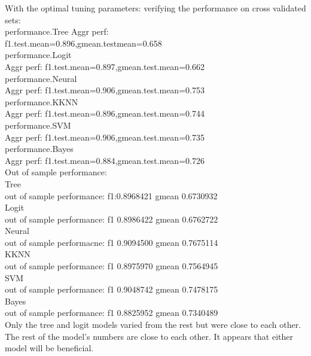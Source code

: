 \documentclass{article}
\begin{document}
With the optimal tuning parameters: verifying the performance on cross validated sets:\\


performance.Tree
Aggr perf:\\ f1.test.mean=0.896,gmean.testmean=0.658\\

performance.Logit\\
Aggr perf: f1.test.mean=0.897,gmean.test.mean=0.662\\

performance.Neural\\
Aggr perf: f1.test.mean=0.906,gmean.test.mean=0.753\\

performance.KKNN\\
Aggr perf: f1.test.mean=0.896,gmean.test.mean=0.744\\

performance.SVM\\
Aggr perf: f1.test.mean=0.906,gmean.test.mean=0.735\\

performance.Bayes\\
Aggr perf: f1.test.mean=0.884,gmean.test.mean=0.726\\


Out of sample performance:\\
Tree\\
out of sample performance: f1:0.8968421    gmean 0.6730932 \\
Logit\\
out of sample performance: f1  0.8986422    gmean 0.6762722\\
Neural\\
out of sample performacne: f1 0.9094500 gmean 0.7675114\\
KKNN\\
out of sample performance: f1 0.8975970    gmean 0.7564945\\
SVM\\
out of sample performance: f1 0.9048742  gmean 0.7478175\\
Bayes\\
out of sample performance: f1 0.8825952  gmean 0.7340489\\

Only the tree and logit models varied from the rest but were close to each other. The rest of the model's numbers are close to each other. It appears that either model will be beneficial. 
\end{document}
